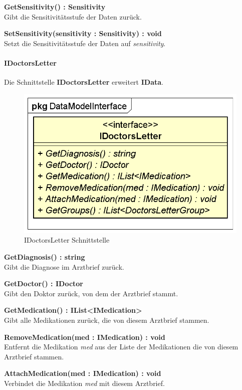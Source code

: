 \documentclass[a4paper]{scrreprt}
\begin{document}
\textbf{GetSensitivity() : Sensitivity}\\
Gibt die Sensitivitätsstufe der Daten zurück.

\textbf{SetSensitivity(sensitivity : Sensitivity) : void}\\
Setzt die Sensitivitätsstufe der Daten auf \textit{sensitivity}.

\paragraph{IDoctorsLetter}
Die Schnittstelle \textbf{IDoctorsLetter} erweitert \textbf{IData}.

\begin{figure}[H]
\centering
\includegraphics[width=0.55\textheight]{graphics/Klassendiagramme/Model/IDoctorsLetter.png}
\caption{IDoctorsLetter Schnittstelle}
\end{figure}
\textbf{GetDiagnosis() : string}\\
Gibt die Diagnose im Arztbrief zurück.

\textbf{GetDoctor() : IDoctor}\\
Gibt den Doktor zurück, von dem der Arztbrief stammt.

\textbf{GetMedication() : IList<IMedication>}\\
Gibt alle Medikationen zurück, die von diesem Arztbrief stammen.

\textbf{RemoveMedication(med : IMedication) : void}\\
Entfernt die Medikation \textit{med} aus der Liste der Medikationen die von diesem Arztbrief stammen.

\textbf{AttachMedication(med : IMedication) : void}\\
Verbindet die Medikation \textit{med} mit diesem Arztbrief.
\end{document}
